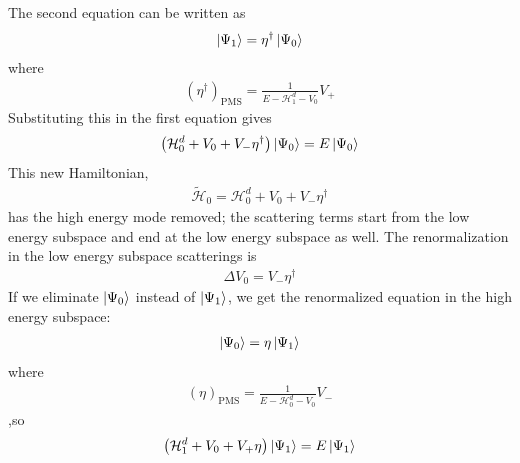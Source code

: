 \documentclass[twoside]{report}
\numberwithin{equation}{section}
\begin{document}
The second equation can be written as
\begin{equation}\begin{aligned}
\ket{\Psi_1} = \eta^\dagger \ket{\Psi_0}
\end{aligned}\end{equation}
where
\begin{equation}\begin{aligned}
	\left(\eta^\dagger\right)_\text{PMS} = \frac{1}{E - \mathcal{H}^d_1 - V_0}V_+
\end{aligned}\end{equation}
Substituting this in the first equation gives
\begin{equation}\begin{aligned}
	\label{reneq}
	\left(\mathcal{H}^d_0 + V_0 + V_- \eta^\dagger\right)\ket{\Psi_0} = E\ket{\Psi_0}
\end{aligned}\end{equation}
This new Hamiltonian,
\begin{equation}\begin{aligned}
	\tilde{\mathcal{H}}_0 = \mathcal{H}^d_0 + V_0 + V_- \eta^\dagger
\end{aligned}\end{equation}
has the high energy mode removed; the scattering terms start from the low energy subspace and end at the low energy subspace as well. The renormalization in the low energy subspace scatterings  is
\begin{equation}\begin{aligned}
	\label{deltaV}
\Delta V_0 = V_- \eta^\dagger
\end{aligned}\end{equation}
If we eliminate \(\ket{\Psi_0}\) instead of \(\ket{\Psi_1}\), we get the renormalized equation in the high energy subspace:
\begin{equation}\begin{aligned}
\ket{\Psi_0} = \eta \ket{\Psi_1}
\end{aligned}\end{equation}
where
\begin{equation}\begin{aligned}
	\left(\eta\right)_\text{PMS} = \frac{1}{E - \mathcal{H}^d_0 - V_0}V_-
\end{aligned}\end{equation}
,so
\begin{equation}\begin{aligned}
	\left(\mathcal{H}^d_1 + V_0 + V_+ \eta\right)\ket{\Psi_1} = E\ket{\Psi_1}
\end{aligned}\end{equation}
\end{document}
